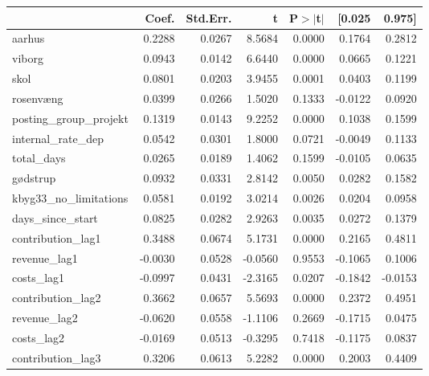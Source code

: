 \begin{table}
\begin{center}
\begin{tabular}{lrrrrrr}
\hline
                                   &   Coef. & Std.Err. &       t & P$> |$t$|$ &  [0.025 &  0.975]  \\
\hline
aarhus                             &  0.2288 &   0.0267 &  8.5684 &      0.0000 &  0.1764 &  0.2812  \\
viborg                             &  0.0943 &   0.0142 &  6.6440 &      0.0000 &  0.0665 &  0.1221  \\
skol                               &  0.0801 &   0.0203 &  3.9455 &      0.0001 &  0.0403 &  0.1199  \\
rosenvæng                          &  0.0399 &   0.0266 &  1.5020 &      0.1333 & -0.0122 &  0.0920  \\
posting\_group\_projekt            &  0.1319 &   0.0143 &  9.2252 &      0.0000 &  0.1038 &  0.1599  \\
internal\_rate\_dep                &  0.0542 &   0.0301 &  1.8000 &      0.0721 & -0.0049 &  0.1133  \\
total\_days                        &  0.0265 &   0.0189 &  1.4062 &      0.1599 & -0.0105 &  0.0635  \\
gødstrup                           &  0.0932 &   0.0331 &  2.8142 &      0.0050 &  0.0282 &  0.1582  \\
kbyg33\_no\_limitations            &  0.0581 &   0.0192 &  3.0214 &      0.0026 &  0.0204 &  0.0958  \\
days\_since\_start                 &  0.0825 &   0.0282 &  2.9263 &      0.0035 &  0.0272 &  0.1379  \\
contribution\_lag1                 &  0.3488 &   0.0674 &  5.1731 &      0.0000 &  0.2165 &  0.4811  \\
revenue\_lag1                      & -0.0030 &   0.0528 & -0.0560 &      0.9553 & -0.1065 &  0.1006  \\
costs\_lag1                        & -0.0997 &   0.0431 & -2.3165 &      0.0207 & -0.1842 & -0.0153  \\
contribution\_lag2                 &  0.3662 &   0.0657 &  5.5693 &      0.0000 &  0.2372 &  0.4951  \\
revenue\_lag2                      & -0.0620 &   0.0558 & -1.1106 &      0.2669 & -0.1715 &  0.0475  \\
costs\_lag2                        & -0.0169 &   0.0513 & -0.3295 &      0.7418 & -0.1175 &  0.0837  \\
contribution\_lag3                 &  0.3206 &   0.0613 &  5.2282 &      0.0000 &  0.2003 &  0.4409  \\

\end{tabular}
\end{center}
\end{table}
